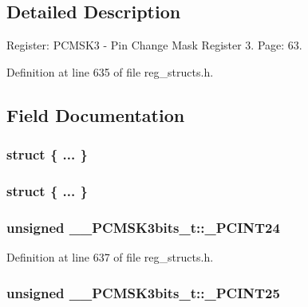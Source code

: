 \subsection{Detailed Description}
Register\+: P\+C\+M\+S\+K3 -\/ Pin Change Mask Register 3. Page\+: 63. 

Definition at line 635 of file reg\+\_\+structs.\+h.



\subsection{Field Documentation}
\hypertarget{union_____p_c_m_s_k3bits__t_af63a963cea64ab7c68789aea0baa9ef7}{\subsubsection[{"@153}]{\setlength{\rightskip}{0pt plus 5cm}struct \{ ... \} }}\label{union_____p_c_m_s_k3bits__t_af63a963cea64ab7c68789aea0baa9ef7}
\hypertarget{union_____p_c_m_s_k3bits__t_a41015e30d26f02bbadb0c10ffe318663}{\subsubsection[{"@155}]{\setlength{\rightskip}{0pt plus 5cm}struct \{ ... \} }}\label{union_____p_c_m_s_k3bits__t_a41015e30d26f02bbadb0c10ffe318663}
\hypertarget{union_____p_c_m_s_k3bits__t_a78b80e558d274bdd09a4bf9a77fafdbd}{
\subsubsection[{\+\_\+\+P\+C\+I\+N\+T24}]{\setlength{\rightskip}{0pt plus 5cm}unsigned \+\_\+\+\_\+\+P\+C\+M\+S\+K3bits\+\_\+t\+::\+\_\+\+P\+C\+I\+N\+T24}}\label{union_____p_c_m_s_k3bits__t_a78b80e558d274bdd09a4bf9a77fafdbd}


Definition at line 637 of file reg\+\_\+structs.\+h.

\hypertarget{union_____p_c_m_s_k3bits__t_af856e689d838444c14a437917852de49}{
\subsubsection[{\+\_\+\+P\+C\+I\+N\+T25}]{\setlength{\rightskip}{0pt plus 5cm}unsigned \+\_\+\+\_\+\+P\+C\+M\+S\+K3bits\+\_\+t\+::\+\_\+\+P\+C\+I\+N\+T25}}\label{union_____p_c_m_s_k3bits__t_af856e689d838444c14a437917852de49}


